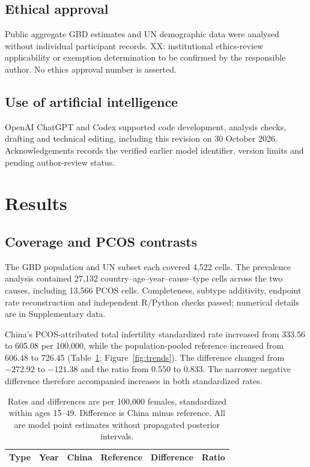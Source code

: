 \documentclass[11pt,a4paper]{article}
\begin{document}
\subsection{Ethical approval}
Public aggregate GBD estimates and UN demographic data were analysed without individual participant records. XX: institutional ethics-review applicability or exemption determination to be confirmed by the responsible author. No ethics approval number is asserted.

\subsection{Use of artificial intelligence}
OpenAI ChatGPT and Codex supported code development, analysis checks, drafting and technical editing, including this revision on 30 October 2026. Acknowledgements records the verified earlier model identifier, version limits and pending author-review status.

\section{Results}
\subsection{Coverage and PCOS contrasts}
The GBD population and UN subset each covered 4,522 cells. The prevalence analysis contained 27,132 country--age--year--cause--type cells across the two causes, including 13,566 PCOS cells. Completeness, subtype additivity, endpoint rate reconstruction and independent R/Python checks passed; numerical details are in Supplementary data.

China's PCOS-attributed total infertility standardized rate increased from 333.56 to 605.08 per 100,000, while the population-pooled reference increased from 606.48 to 726.45 (Table~\ref{tab:pcos}; Figure~\ref{fig:trends}). The difference changed from $-272.92$ to $-121.38$ and the ratio from 0.550 to 0.833. The narrower negative difference therefore accompanied increases in both standardized rates.

\begin{table}[htbp]\centering\small{}
\caption{PCOS-attributed infertility rates and contrasts under contemporary GBD population shares.}\label{tab:pcos}
\begin{tabular}{llrrrr}\toprule
Type & Year & China & Reference & Difference & Ratio\\\midrule
\end{tabular}
\caption*{Rates and differences are per 100,000 females, standardized within ages 15--49. Difference is China minus reference. All are model point estimates without propagated posterior intervals.}
\end{table}
\end{document}
